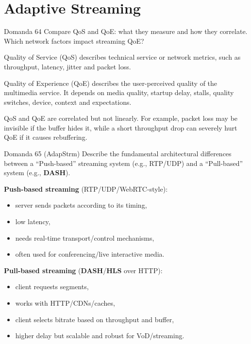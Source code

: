 \section{Adaptive Streaming}




\begin{questionbox}{Domanda 64}
Compare QoS and QoE: what they measure and how they correlate. Which network factors impact streaming QoE?
\end{questionbox}


Quality of Service (QoS) describes technical service or network metrics, such as throughput, latency, jitter and packet loss.

Quality of Experience (QoE) describes the user-perceived quality of the multimedia service. It depends on media quality, startup delay, stalls, quality switches, device, context and expectations.

QoS and QoE are correlated but not linearly. For example, packet loss may be invisible if the buffer hides it, while a short throughput drop can severely hurt QoE if it causes rebuffering.



\begin{questionbox}{Domanda 65}
(AdapStrm) Describe the fundamental architectural differences between a “Push-based” streaming system (e.g., RTP/UDP) and a “Pull-based” system (e.g., \textbf{DASH}).
\end{questionbox}


\textbf{Push-based streaming} (RTP/UDP/WebRTC-style):

\begin{itemize}
  \item server sends packets according to its timing,
  \item low latency,
  \item needs real-time transport/control mechanisms,
  \item often used for conferencing/live interactive media.
\end{itemize}

\textbf{Pull-based streaming} (\textbf{DASH}/\textbf{HLS} over HTTP):

\begin{itemize}
  \item client requests segments,
  \item works with HTTP/CDNs/caches,
  \item client selects bitrate based on throughput and buffer,
  \item higher delay but scalable and robust for VoD/streaming.
\end{itemize}



